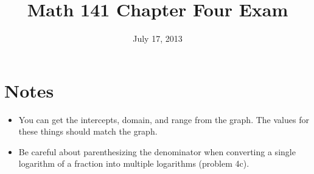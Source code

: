\documentclass[fleqn,addpoints]{exam}
\title{Math 141 Chapter Four Exam}
\date{July 17, 2013}
\author{}
\begin{document}
  \maketitle  

  \ifprintanswers
    \section{Notes}
    \begin{itemize}
      \item You can get the intercepts, domain, and range from the graph.  The values for these things should match the
        graph.

      \item Be careful about parenthesizing the denominator when converting a single logarithm of a fraction into multiple
        logarithms (problem 4c).
    \end{itemize}
  \fi


  \ifprintanswers
  \else
    \begin{center}
      \gradetable[h][pages]
      \bonusgradetable[h][pages]
    \end{center}
  \fi


\end{document}
